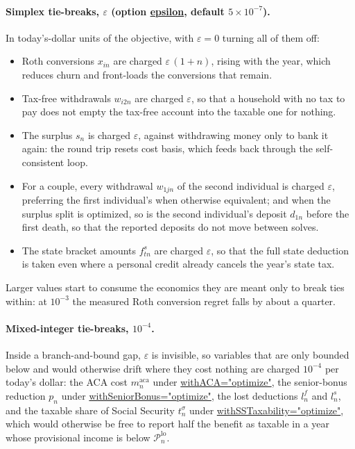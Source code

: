 \documentclass[fleqn,12pt]{report}
\newcommand{\code}[1]{\url{#1}}
\begin{document}
\paragraph*{Simplex tie-breaks, $\varepsilon$ (option \code{epsilon}, default $5\times10^{-7}$).}
In today's-dollar units of the objective, with $\varepsilon = 0$ turning all of them off:
\begin{itemize}[nosep]
\item Roth conversions $x_{in}$ are charged $\varepsilon\,(1+n)$, rising with the year, which
	reduces churn and front-loads the conversions that remain.
\item Tax-free withdrawals $w_{i2n}$ are charged $\varepsilon$, so that a household with no tax
	to pay does not empty the tax-free account into the taxable one for nothing.
\item The surplus $s_n$ is charged $\varepsilon$, against withdrawing money only to bank it
	again: the round trip resets cost basis, which feeds back through the self-consistent loop.
\item For a couple, every withdrawal $w_{1jn}$ of the second individual is charged
	$\varepsilon$, preferring the first individual's when otherwise equivalent; and when the
	surplus split is optimized, so is the second individual's deposit $d_{1n}$ before the first
	death, so that the reported deposits do not move between solves.
\item The state bracket amounts $f^{s}_{tn}$ are charged $\varepsilon$, so that the full state
	deduction is taken even where a personal credit already cancels the year's state tax.
\end{itemize}
Larger values start to consume the economics they are meant only to break ties within: at
$10^{-3}$ the measured Roth conversion regret falls by about a quarter.

\paragraph*{Mixed-integer tie-breaks, $10^{-4}$.}
Inside a branch-and-bound gap, $\varepsilon$ is invisible, so variables that are only bounded
below and would otherwise drift where they cost nothing are charged $10^{-4}$ per today's
dollar: the ACA cost $m^{\mathrm{aca}}_n$ under \code{withACA="optimize"}, the senior-bonus
reduction $p_n$ under \code{withSeniorBonus="optimize"}, the lost deductions $l^{f}_n$ and
$l^{s}_n$, and the taxable share of Social Security $t^{\sigma}_n$ under
\code{withSSTaxability="optimize"}, which would otherwise be free to report half the benefit
as taxable in a year whose provisional income is below $\mathcal{P}^{\mathrm{lo}}_n$.
\end{document}

